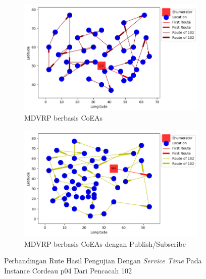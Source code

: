 \begin{figure}[H]
	\centering
	\begin{subfigure}[t]{\textwidth}
		\centering
		\includegraphics[width=\textwidth]{Resources/Images/cordeau_p04_tw/cordeau_p04_tw_102_coes}
		\caption{MDVRP berbasis CoEAs}
		\label{fig:cordeau_p04_tw_102_coes}
	\end{subfigure}
	\begin{subfigure}[t]{\textwidth}
		\centering
		\includegraphics[width=\textwidth]{Resources/Images/cordeau_p04_tw/cordeau_p04_tw_102_pubsub_coes}
		\caption{MDVRP berbasis CoEAs dengan Publish/Subscribe}
		\label{fig:cordeau_p04_tw_102_pubsub_coes}
	\end{subfigure}
	\caption{Perbandingan Rute Hasil Pengujian Dengan \textit{Service Time} Pada Instance Cordeau p04 Dari Pencacah 102}
	\label{fig:cordeau_p04_tw_102}
\end{figure}


